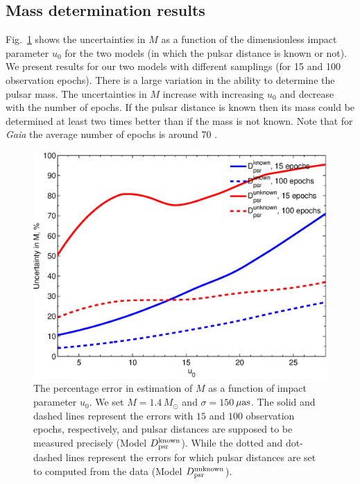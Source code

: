 \documentclass[iop,apj]{emulateapj}
\begin{document}
\subsection{Mass determination results}

Fig.~\ref{mass_u0} shows the uncertainties in $M$ as a function of the dimensionless
impact parameter $u_0$ for the two models (in which the pulsar distance is known or not).  
%
We present results for our two models with different samplings (for 15 and 100 observation epochs). 
There is a large variation in the ability to determine the pulsar
mass. The uncertainties in $M$ increase with increasing $u_0$ and
decrease with the number of epochs. If the pulsar distance is known
then its mass could be determined at least two times better than if
the mass is not known. Note that for \textit{Gaia} the average number
of epochs is around 70 \citep{DeBruijne12}.
%
%
\begin{figure}
\begin{center}
  \includegraphics[width=3.5 in]{u0_mass.eps}
%
\caption{The percentage error in estimation of $M$ as a function of impact parameter $u_0$.
We set $M=1.4$\,$M_{\odot}$ and $\sigma=150$\,$\rm{\mu as}$. The solid and dashed 
lines represent the errors with $15$ and $100$ observation epochs, respectively, and pulsar distances 
are supposed to be measured precisely (Model $D_{\rm{psr}}^{\rm{known}}$). While the dotted and dot-dashed lines represent 
the errors for which pulsar distances are set to computed from the data (Model $D_{\rm{psr}}^{\rm{unknown}}$).
}
\label{mass_u0}
\end{center}
\end{figure}
%
%
\end{document}
